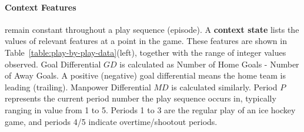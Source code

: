 \documentclass[runningheads,a4paper]{llncs}
\begin{document}
\paragraph{Context Features} remain constant throughout a play sequence (episode). 
%
A \textbf{context state} lists the values of relevant features at a point in the game. 
These features are shown in Table~\ref{table:play-by-play-data}(left), together with the range of integer values observed. Goal Differential $GD$ is calculated as Number of Home Goals - Number of Away Goals. A positive (negative) goal differential means the home team is leading (trailing).  Manpower Differential $MD$ is calculated similarly.
Period $P$ represents the current period number the play sequence occurs in, typically ranging in value from 1 to 5. Periods 1 to 3 are the regular play of an ice hockey game, and periods 4/5 indicate overtime/shootout periods.
\end{document}
